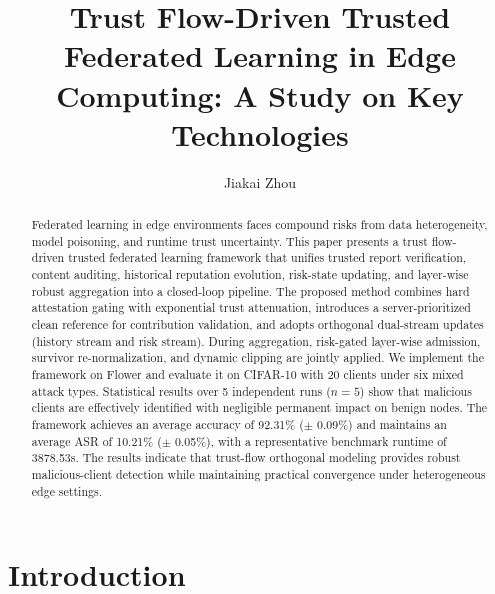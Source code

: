 \documentclass[runningheads]{llncs}
\begin{document}
\title{Trust Flow-Driven Trusted Federated Learning in Edge Computing: A Study on Key Technologies}

\author{Jiakai Zhou}


\maketitle

\begin{abstract}
Federated learning in edge environments faces compound risks from data
heterogeneity, model poisoning, and runtime trust uncertainty. This paper presents
a trust flow-driven trusted federated learning framework that unifies trusted
report verification, content auditing, historical reputation evolution, risk-state
updating, and layer-wise robust aggregation into a closed-loop pipeline. The
proposed method combines hard attestation gating with exponential trust
attenuation, introduces a server-prioritized clean reference for contribution
validation, and adopts orthogonal dual-stream updates (history stream and risk
stream). During aggregation, risk-gated layer-wise admission, survivor re-normalization,
and dynamic clipping are jointly applied. We implement the framework on Flower and evaluate it on CIFAR-10 with 20 clients
under six mixed attack types. Statistical results over 5 independent runs
($n=5$) show that malicious clients are effectively identified with
negligible permanent impact on benign nodes. The framework achieves an average
accuracy of 92.31\% ($\pm$ 0.09\%) and maintains an average ASR of 10.21\% ($\pm$ 0.05\%), with a
representative benchmark runtime of 3878.53s. The results indicate that
trust-flow orthogonal modeling provides robust malicious-client detection
while maintaining practical convergence under heterogeneous edge settings.

\end{abstract}

\section{Introduction}
\end{document}
